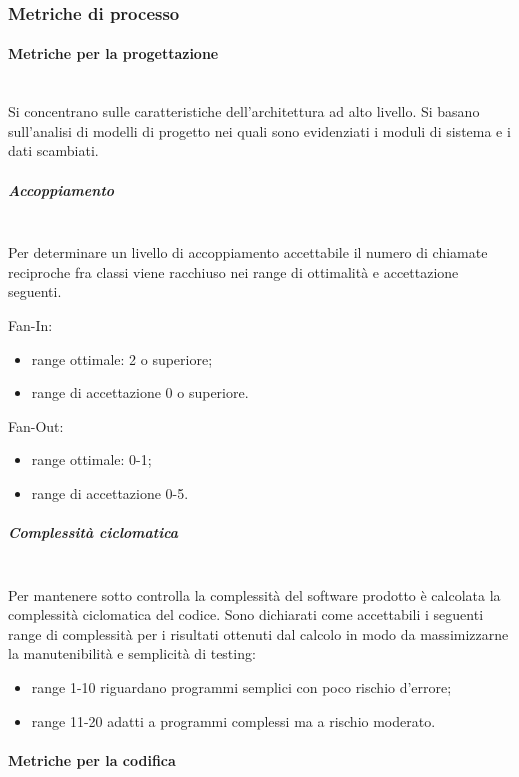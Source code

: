 \subsubsection{Metriche di processo}\label{sec:metriche_processo}

\paragraph{Metriche per la progettazione}\mbox{}\\
Si concentrano sulle caratteristiche dell'architettura ad alto livello. Si basano sull'analisi di modelli di progetto nei quali sono evidenziati i moduli di sistema e i dati scambiati.

\subparagraph{Accoppiamento}\mbox{}\\
Per determinare un livello di accoppiamento accettabile il numero di chiamate reciproche fra classi viene racchiuso nei range di ottimalità e accettazione seguenti.

Fan-In:
\begin{itemize}
	\item range ottimale: 2 o superiore;
	\item range di accettazione 0 o superiore.
\end{itemize}

Fan-Out:
\begin{itemize}
	\item range ottimale: 0-1;
	\item range di accettazione 0-5.
\end{itemize}

\subparagraph{Complessità ciclomatica}\mbox{}\\
Per mantenere sotto controlla la complessità del software prodotto è calcolata la complessità ciclomatica del codice. 
Sono dichiarati come accettabili i seguenti range di complessità per i risultati ottenuti dal calcolo in modo da massimizzarne la manutenibilità e semplicità di testing: 
\begin{itemize}
	\item range 1-10 riguardano programmi semplici con poco rischio d'errore;
	\item range 11-20 adatti a programmi complessi ma a rischio moderato.
\end{itemize}

\paragraph{Metriche per la codifica}\mbox{}

